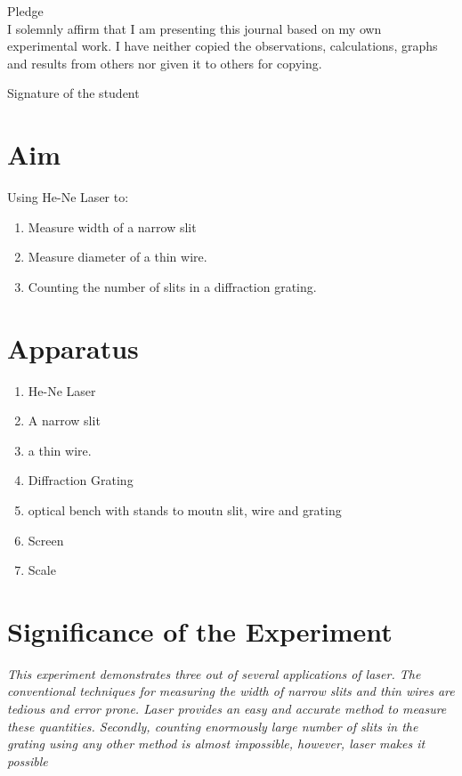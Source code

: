\documentclass[11pt]{article}
\begin{document}
	\begin{center}
	{\Large Pledge}\\
	\vspace{0.5cm}
	I solemnly affirm that I am presenting this journal based on my own experimental work. I have neither copied the observations, calculations, graphs and results from others nor given it to others for copying.\\
		\end{center}
	
	\vspace{0.5cm}
	
    \begin{flushright}
	{\large Signature of the student}\\
	\vspace{1cm}
	 \end{flushright}
	
	

	\section{Aim}
	\noindent
	Using He-Ne Laser to: 
	 \begin{enumerate}
		 \item Measure width of a narrow slit
   \item Measure diameter of a thin wire. 
   \item Counting the number of slits in a diffraction grating. 
	 \end{enumerate}
	
	\section{Apparatus}


		\begin{enumerate}
			\item He-Ne Laser
			\item A narrow slit
   \item a thin wire. 
   \item Diffraction Grating
   \item optical bench with stands to moutn slit, wire and grating
   \item Screen
   \item Scale
		\end{enumerate}


	\section{Significance of the Experiment}
\textit{This experiment demonstrates three out of several applications
of laser. The conventional techniques for measuring the width of narrow slits and thin wires are
tedious and error prone. Laser provides an easy and accurate method to measure these
quantities. Secondly, counting enormously large number of slits in the grating using any other
method is almost impossible, however, laser makes it possible}
	
\end{document}
